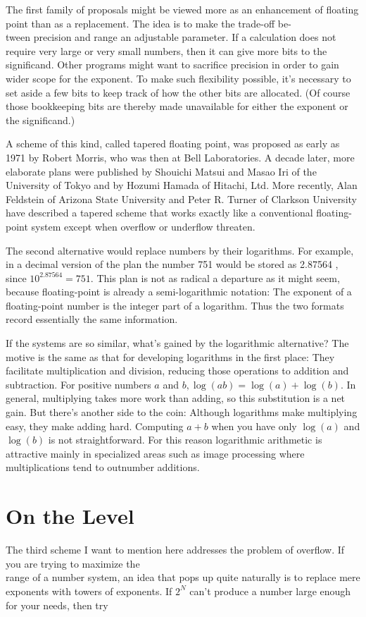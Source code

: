 \documentclass[10pt]{article}
\begin{document}
The first family of proposals might be viewed more as an enhancement of floating point than as a replacement. The idea is to make the trade-off be-\\
tween precision and range an adjustable parameter. If a calculation does not require very large or very small numbers, then it can give more bits to the significand. Other programs might want to sacrifice precision in order to gain wider scope for the exponent. To make such flexibility possible, it's necessary to set aside a few bits to keep track of how the other bits are allocated. (Of course those bookkeeping bits are thereby made unavailable for either the exponent or the significand.)

A scheme of this kind, called tapered floating point, was proposed as early as 1971 by Robert Morris, who was then at Bell Laboratories. A decade later, more elaborate plans were published by Shouichi Matsui and Masao Iri of the University of Tokyo and by Hozumi Hamada of Hitachi, Ltd. More recently, Alan Feldstein of Arizona State University and Peter R. Turner of Clarkson University have described a tapered scheme that works exactly like a conventional floating-point system except when overflow or underflow threaten.

The second alternative would replace numbers by their logarithms. For example, in a decimal version of the plan the number 751 would be stored as 2.87564 , since $10^{2.87564}=751$. This plan is not as radical a departure as it might seem, because floating-point is already a semi-logarithmic notation: The exponent of a floating-point number is the integer part of a logarithm. Thus the two formats record essentially the same information.

If the systems are so similar, what's gained by the logarithmic alternative? The motive is the same as that for developing logarithms in the first place: They facilitate multiplication and division, reducing those operations to addition and subtraction. For positive numbers $a$ and $b, \log (a b)=\log (a)+\log (b)$. In general, multiplying takes more work than adding, so this substitution is a net gain. But there's another side to the coin: Although logarithms make multiplying easy, they make adding hard. Computing $a+b$ when you have only $\log (a)$ and $\log (b)$ is not straightforward. For this reason logarithmic arithmetic is attractive mainly in specialized areas such as image processing where multiplications tend to outnumber additions.

\section*{On the Level}
The third scheme I want to mention here addresses the problem of overflow. If you are trying to maximize the\\
range of a number system, an idea that pops up quite naturally is to replace mere exponents with towers of exponents. If $2^{N}$ can't produce a number large enough for your needs, then try
\end{document}
